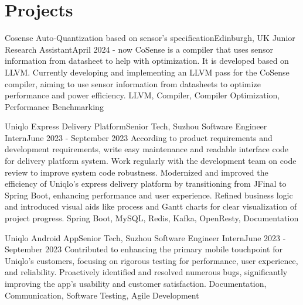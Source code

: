\section{Projects}
  \resumeSubHeadingListStart
    \resumeSubheading
      {Cosense Auto‑Quantization based on sensor’s specification}{Edinburgh, UK}
      {Junior Research Assistant}{April 2024 - now}
      \resumeItemListStart
          {CoSense is a compiler that uses sensor information from datasheet to help with optimization. It is developed based on LLVM.}
          {Currently developing and implementing an LLVM pass for the CoSense compiler, aiming to use sensor information from datasheets to optimize performance and power efficiency.}
          {LLVM, Compiler, Compiler Optimization, Performance Benchmarking}
      \resumeItemListEnd

    \resumeSubheading
      {Uniqlo Express Delivery Platform}{Senior Tech, Suzhou}
      {Software Engineer Intern}{June 2023 - September 2023}
      \resumeItemListStart
          {According to product requirements and development requirements, write easy maintenance and readable interface code for delivery platform system.}
          {Work regularly with the development team on code review to improve system code robustness.}
          {Modernized and improved the efficiency of Uniqlo’s express delivery platform by transitioning from JFinal to Spring Boot, enhancing performance and user experience.}
          {Refined business logic and introduced visual aids like process and Gantt charts for clear visualization of project progress.}
          {Spring Boot, MySQL, Redis, Kafka, OpenResty, Documentation}
      \resumeItemListEnd

    \resumeSubheading
      {Uniqlo Android App}{Senior Tech, Suzhou}
      {Software Engineer Intern}{June 2023 - September 2023}
      \resumeItemListStart
          {Contributed to enhancing the primary mobile touchpoint for Uniqlo’s customers, focusing on rigorous testing for performance, user experience, and reliability.}
          {Proactively identified and resolved numerous bugs, significantly improving the app’s usability and customer satisfaction.}
          {Documentation, Communication, Software Testing, Agile Development}
      \resumeItemListEnd

